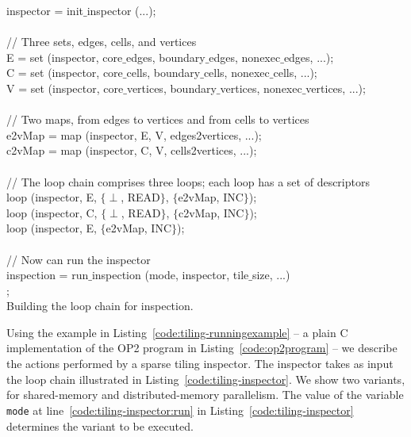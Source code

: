 \begin{algorithm}
\scriptsize\ttfamily
{}
inspector = init$\_$inspector (...);\\
~\\
// Three sets, edges, cells, and vertices\\
E = set (inspector, core$\_$edges, boundary$\_$edges, nonexec$\_$edges, ...);\\
C = set (inspector, core$\_$cells, boundary$\_$cells, nonexec$\_$cells, ...);\\
V = set (inspector, core$\_$vertices, boundary$\_$vertices, nonexec$\_$vertices, ...);\\ 
~\\
// Two maps, from edges to vertices and from cells to vertices\\
e2vMap = map (inspector, E, V, edges2vertices, ...);\\
c2vMap = map (inspector, C, V, cells2vertices, ...);\\
~\\
// The loop chain comprises three loops; each loop has a set of descriptors\\
loop (inspector, E, $\lbrace \perp$, READ$\rbrace$, $\lbrace$e2vMap, INC$\rbrace$);\\
loop (inspector, C, $\lbrace \perp$, READ$\rbrace$, $\lbrace$c2vMap, INC$\rbrace$);\\
loop (inspector, E, $\lbrace$e2vMap, INC$\rbrace$); \\
~\\
// Now can run the inspector\\
inspection = run$\_$inspection (mode, inspector, tile$\_$size, ...)\\ \label{code:tiling-inspector:run}
;\\
\caption{Building the loop chain for inspection.}
\label{code:tiling-inspector}
\end{algorithm}

Using the example in Listing~\ref{code:tiling-runningexample} -- a plain C implementation of the OP2 program in Listing~\ref{code:op2program} -- we describe the actions performed by a sparse tiling inspector. The inspector takes as input the loop chain illustrated in Listing~\ref{code:tiling-inspector}. We show two variants, for shared-memory and distributed-memory parallelism. The value of the variable \texttt{mode} at line~\ref{code:tiling-inspector:run} in Listing~\ref{code:tiling-inspector} determines the variant to be executed.

